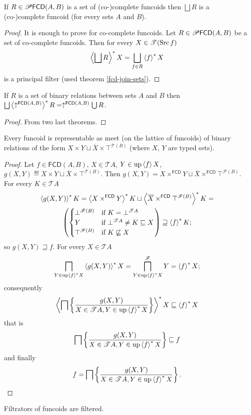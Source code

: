\begin{thm}
\label{fcd-join-compl}If $R\in\mathscr{P}\mathsf{FCD}(A,B)$ is a set
of (co-)complete funcoids then $\bigsqcup R$ is a (co-)complete funcoid
(for every sets $A$ and $B$).\end{thm}
\begin{proof}
It is enough to prove for co-complete funcoids. Let
$R\in\mathscr{P}\mathsf{FCD}(A,B)$
be a set of co-complete funcoids. Then for every $X\in\mathscr{T}(\operatorname{Src} f)$
\[
\rsupfun{\bigsqcup R}X=\bigsqcup_{f\in R}\rsupfun fX
\]
is a principal filter (used theorem \ref{fcd-join-sets}).\end{proof}
\begin{cor}
\label{fcd-compl-join}If $R$ is a set of binary relations between
sets $A$ and $B$ then
$\bigsqcup\rsupfun{\uparrow^{\mathsf{FCD}(A,B)}}R=\uparrow^{\mathsf{FCD}(A,B)}
\bigcup R$.\end{cor}
\begin{proof}
From two last theorems.\end{proof}
\begin{lem}
\label{fcd-rep}Every funcoid is representable as meet (on the lattice
of funcoids) of binary relations of the form
$X\times Y\sqcup\overline{X}\times\top^{\mathscr{T}(B)}$ (where $X$, $Y$ are typed sets).\end{lem}
\begin{proof}
Let $f\in\mathsf{FCD}(A,B)$, $X\in\mathscr{T}A$, $Y\in\operatorname{up}\left\langle f\right\rangle X$,
$g(X,Y)\eqdef X\times Y\sqcup\overline{X}\times\top^{\mathscr{T}(B)}$.
Then $g(X,Y)=X\times^{\mathsf{FCD}}Y\sqcup\overline{X}\times^{\mathsf{FCD}}\top^{\mathscr{F}(B)}$.
For every $K\in\mathscr{T}A$
\begin{multline*}
\left\langle g(X,Y)\right\rangle ^{\ast}K=\left\langle X\times^{\mathsf{FCD}}Y\right\rangle ^{\ast}K\sqcup\left\langle \overline{X}
\times^{\mathsf{FCD}}\top^{\mathscr{F}(B)}\right\rangle ^{\ast}K=\\
\left(\begin{cases}
\bot^{\mathscr{F}(B)} & \text{if }K=\bot^{\mathscr{T}A}\\
Y & \text{if }\bot^{\mathscr{T}A}\ne K\sqsubseteq X\\
\top^{\mathscr{F}(B)} & \text{if }K\not\sqsubseteq X
\end{cases}\right)\sqsupseteq\left\langle f\right\rangle ^{\ast}K;
\end{multline*}
so $g(X,Y)\sqsupseteq f$. For every $X\in\mathscr{T}A$
\[
\bigsqcap_{Y\in\operatorname{up}\left\langle f\right\rangle ^{\ast}X}\left\langle g(X,Y)\right\rangle ^{\ast}X=\bigsqcap^{\mathscr{F}}_{Y\in\operatorname{up}\left\langle f\right\rangle ^{\ast}X}Y=\left\langle f\right\rangle ^{\ast}X;
\]
consequently
\[
\left\langle \bigsqcap\left\{ \frac{g(X,Y)}{X\in\mathscr{T}A,Y\in\operatorname{up}\left\langle f\right\rangle ^{\ast}X}\right\}\right\rangle ^{\ast}X\sqsubseteq\left\langle f\right\rangle ^{\ast}X
\]
that is
\[
\bigsqcap\left\{ \frac{g(X,Y)}{X\in\mathscr{T}A,Y\in\operatorname{up}\left\langle f\right\rangle ^{\ast}X}\right\}\sqsubseteq f
\]
 and finally
\[
f=\bigsqcap\left\{ \frac{g(X,Y)}{X\in\mathscr{T}A,Y\in\operatorname{up}\left\langle f\right\rangle ^{\ast}X}\right\}.
\]
\end{proof}
\begin{cor}
\label{fcd-filtered}Filtrators of funcoids are filtered.
\end{cor}

